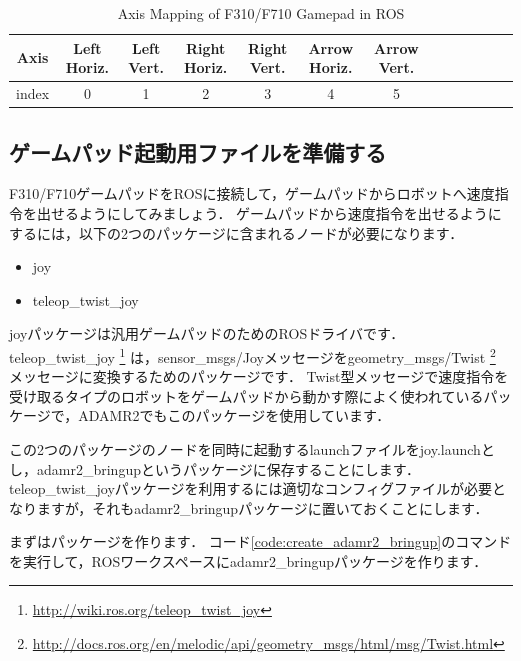 \documentclass[{../../master}]{subfiles}
\begin{document}
\begin{table}[h]
  \begin{center}
    \caption{Axis Mapping of F310/F710 Gamepad in ROS}
    \begin{tabular}{|c|c|c|c|c|c|c|c|c|c|c|c|c|} \hline
      Axis  & Left Horiz. & Left Vert. & Right Horiz. & Right Vert. & Arrow Horiz. & Arrow Vert. \\ \hline
      index & 0 & 1 & 2 & 3 & 4  & 5 \\ \hline
    \end{tabular}
    \label{tab:axis_mapping}
  \end{center}
\end{table}

\subsection{ゲームパッド起動用ファイルを準備する}

F310/F710ゲームパッドをROSに接続して，ゲームパッドからロボットへ速度指令を出せるようにしてみましょう．
ゲームパッドから速度指令を出せるようにするには，以下の2つのパッケージに含まれるノードが必要になります．

\begin{itemize}
  \item \textsf{joy}
  \item \textsf{teleop\_twist\_joy}
\end{itemize}

\textsf{joy}パッケージは汎用ゲームパッドのためのROSドライバです．
\textsf{teleop\_twist\_joy}
\footnote{\url{http://wiki.ros.org/teleop_twist_joy}}
は，\textsf{sensor\_msgs/Joy}メッセージを\textsf{geometry\_msgs/Twist}
\footnote{\url{http://docs.ros.org/en/melodic/api/geometry_msgs/html/msg/Twist.html}}
メッセージに変換するためのパッケージです．
\textsf{Twist}型メッセージで速度指令を受け取るタイプのロボットをゲームパッドから動かす際によく使われているパッケージで，ADAMR2でもこのパッケージを使用しています．

この2つのパッケージのノードを同時に起動するlaunchファイルを\textsf{joy.launch}とし，\textsf{adamr2\_bringup}というパッケージに保存することにします．
\textsf{teleop\_twist\_joy}パッケージを利用するには適切なコンフィグファイルが必要となりますが，それも\textsf{adamr2\_bringup}パッケージに置いておくことにします．

まずはパッケージを作ります．
コード\ref{code:create_adamr2_bringup}のコマンドを実行して，ROSワークスペースに\textsf{adamr2\_bringup}パッケージを作ります．
\end{document}

